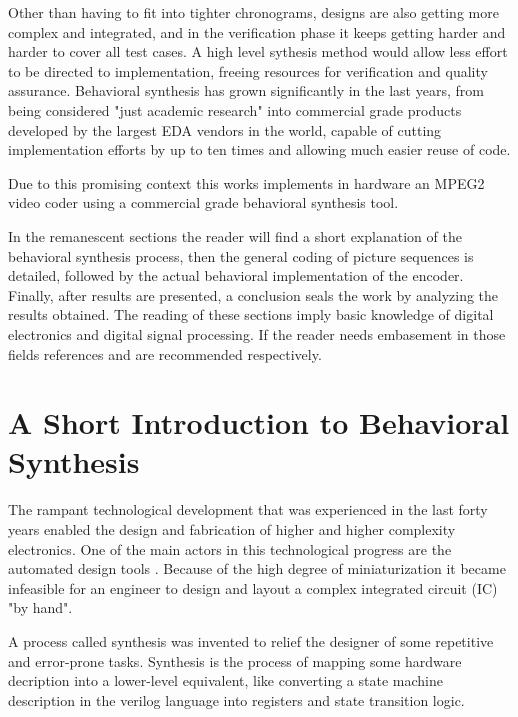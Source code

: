 \documentclass[a4paper, 12pt]{article}
\begin{document}
Other than having to fit into tighter chronograms, designs are also getting more complex and integrated, and in the verification phase it keeps getting harder and harder to cover all test cases. A high level sythesis method would allow less effort to be directed to implementation, freeing resources for verification and quality assurance. Behavioral synthesis has grown significantly in the last years, from being considered "just academic research" into commercial grade products developed by the largest EDA vendors in the world, capable of cutting implementation efforts by up to ten times\cite{beh_grounds} and allowing much easier reuse of code.

Due to this promising context this works implements in hardware an MPEG2 video coder using a commercial grade behavioral synthesis tool.

In the remanescent sections the reader will find a short explanation of the behavioral synthesis process, then the general coding of picture sequences is detailed, followed by the actual behavioral implementation of the encoder. Finally, after results are presented, a conclusion seals the work by analyzing the results obtained. The reading of these sections imply basic knowledge of digital electronics and digital signal processing. If the reader needs embasement in those fields references \cite{digitalcircuits} and \cite{lyons_dsp} are recommended respectively.



\pagebreak

\section{A Short Introduction to Behavioral Synthesis}

	The rampant technological development that was experienced in the last forty years enabled the design and fabrication of higher and higher complexity electronics. One of the main actors in this technological progress are the automated design tools \cite{edahistory1}. Because of the high degree of miniaturization it became infeasible for an engineer to design and layout a complex integrated circuit (IC) "by hand".

	A process called synthesis was invented to relief the designer of some repetitive and error-prone tasks. Synthesis is the process of mapping some hardware decription into a lower-level equivalent, like converting a state machine description in the verilog language into registers and state transition logic.
\end{document}
